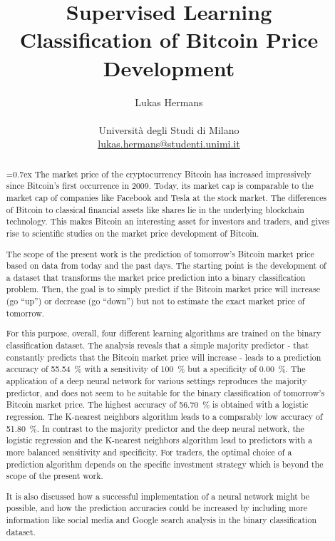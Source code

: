 \title{\large Supervised Learning \\ \LARGE
 Classification of Bitcoin Price Development}
\author{Lukas Hermans\\ \\
{Università degli Studi di Milano} \\
\href{mailto:lukas.hermans@studenti.unimi.it}
{lukas.hermans@studenti.unimi.it}}

\maketitle

\begin{abstract} 
\noindent
{}\font=0.7ex%
The market price of the cryptocurrency Bitcoin has increased impressively since Bitcoin's first occurrence in 2009. Today, its market cap is comparable to the market cap of companies like Facebook and Tesla at the stock market. The differences of Bitcoin to classical financial assets like shares lie in the underlying blockchain technology. This makes Bitcoin an interesting asset for investors and traders, and gives rise to scientific studies on the market price development of Bitcoin. 

\noindent
The scope of the present work is the prediction of tomorrow's Bitcoin market price based on data from today and the past days. The starting point is the development of a dataset that transforms the market price prediction into a binary classification problem. Then, the goal is to simply predict if the Bitcoin market price will increase (go \enquote{up}) or decrease (go \enquote{down}) but not to estimate the exact market price of tomorrow. 

\noindent
For this purpose, overall, four different learning algorithms are trained on the binary classification dataset. The analysis reveals that a simple majority predictor - that constantly predicts that the Bitcoin market price will increase - leads to a prediction accuracy of \SI{55.54}{\percent} with a sensitivity of \SI{100}{\percent} but a specificity of \SI{0.00}{\percent}. The application of a deep neural network for various settings reproduces the majority predictor, and does not seem to be suitable for the binary classification of tomorrow's Bitcoin market price. The highest accuracy of \SI{56.70}{\percent} is obtained with a logistic regression. The K-nearest neighbors algorithm leads to a comparably low accuracy of \SI{51.80}{\percent}. In contrast to the majority predictor and the deep neural network, the logistic regression and the K-nearest neighbors algorithm lead to predictors with a more balanced sensitivity and specificity. For traders, the optimal choice of a prediction algorithm depends on the specific investment strategy which is beyond the scope of the present work.

\noindent
It is also discussed how a successful implementation of a neural network might be possible, and how the prediction accuracies could be increased by including more information like social media and Google search analysis in the binary classification dataset.

\end{abstract}
